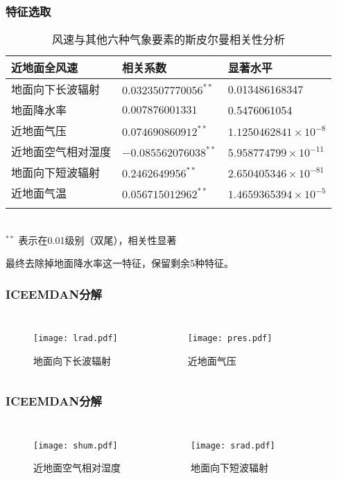 \documentclass[14pt, AutoFakeBold]{ppt}
\begin{document}
\begin{frame}
  \frametitle{特征选取}
  \begin{table}[H]
    \centering
    \caption{风速与其他六种气象要素的斯皮尔曼相关性分析}
    \begin{tabular}{lll}
    \toprule
    近地面全风速 & 相关系数 & 显著水平 \\
    \midrule
    地面向下长波辐射 & $0.0323507770056^{**}$ & 0.013486168347 \\
    地面降水率 & $0.007876001331$ & 0.5476061054 \\
    近地面气压 & $0.074690860912^{**}$ & $1.1250462841\times10^{-8}$ \\
    近地面空气相对湿度 & $-0.085562076038^{**}$ & $5.958774799\times10^{-11}$ \\
    地面向下短波辐射 & $0.2462649956^{**}$ & $2.650405346\times10^{-81}$ \\
    近地面气温 & $0.056715012962^{**}$ & $1.4659365394\times10^{-5}$ \\
    \bottomrule \\
    \end{tabular} \\
    \footnotesize{$^{**}$ 表示在0.01级别（双尾），相关性显著} \\
    \label{relativity-analysis}
\end{table}
最终去除掉地面降水率这一特征，保留剩余5种特征。
\end{frame}

\begin{frame}
  \frametitle{ICEEMDAN分解}
  \begin{columns}
    \begin{figure}[H]
      \centering
      \texttt{[image: lrad.pdf]}
      \caption{地面向下长波辐射}
      \label{fig_ICEEMDAN_lrad}
    \end{figure}
    \begin{figure}[H]
      \centering
      \texttt{[image: pres.pdf]}
      \caption{近地面气压}
      \label{fig_ICEEMDAN_pres}
    \end{figure}
  \end{columns}
\end{frame}

\begin{frame}
  \frametitle{ICEEMDAN分解}
  \begin{columns}
    \begin{figure}[H]
      \centering
      \texttt{[image: shum.pdf]}
      \caption{近地面空气相对湿度}
      \label{fig_ICEEMDAN_shum}
    \end{figure}
    \begin{figure}[H]
      \centering
      \texttt{[image: srad.pdf]}
      \caption{地面向下短波辐射}
      \label{fig_ICEEMDAN_srad}
    \end{figure}
  \end{columns}
\end{frame}
\end{document}
